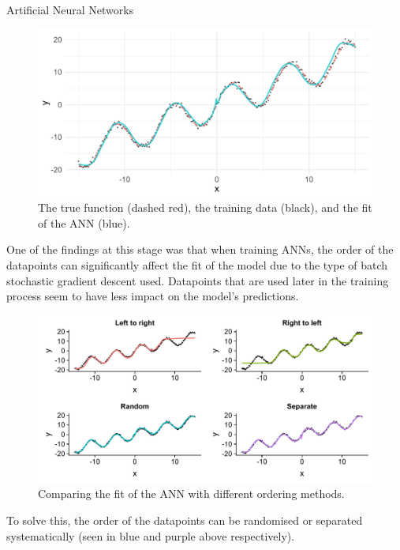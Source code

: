 \documentclass[final]{beamer}
\newlength{\colwidth}
\begin{document}
\begin{frame}[t]
\begin{columns}[t]
\begin{column}{\colwidth}
\begin{block}{Artificial Neural Networks}
\begin{figure}
					\includegraphics[width=\textwidth]{images/ann-trained.pdf}
					\vspace*{-2cm}
					\caption{The true function (dashed red), the training data (black), and the fit of the ANN (blue).}
					\vspace*{-0.5cm}
				\end{figure}
				One of the findings at this stage was that when training ANNs, the order of the datapoints can significantly affect the fit of the model due to the type of batch stochastic gradient descent used.
				Datapoints that are used later in the training process seem to have less impact on the model's predictions.
				\begin{figure}
					\centering
					\includegraphics[width=\textwidth]{images/compare-nn-order.pdf}
					\vspace*{-2cm}
					\caption{Comparing the fit of the ANN with different ordering methods.}
					\vspace*{-0.5cm}
				\end{figure}
				To solve this, the order of the datapoints can be randomised or separated systematically (seen in blue and purple above respectively).
			\end{block}
		\end{column}

\end{columns}
\end{frame}
\end{document}
